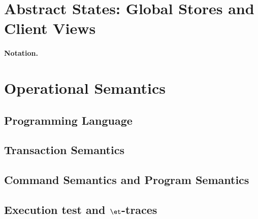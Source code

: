 \makeatletter
{}
\makeatother


\section{Abstract States: Global Stores and Client Views} \label{sec:kvstore-view} 
\label{sec:model}

\paragraph{Notation.} 

\section{Operational Semantics} \label{sec:operational-semantics} 
    \subsection{Programming Language} \label{sec:programming-language} 
    \subsection{Transaction Semantics} \label{sec:transaction-semantics} 
    \subsection{Command Semantics and Program Semantics} \label{sec:program-semantics} 
    \subsection{Execution test and \texorpdfstring{\( \et \)}{\texttt{ET}}-traces} \label{sec:execution-test} 
                    \label{sec:equivalent-expressibility} 
    \label{sec:consistency-model-on-kv} 

